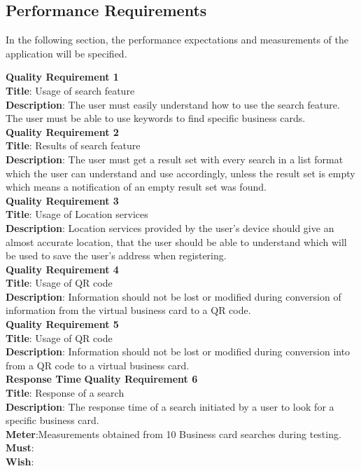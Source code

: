 \documentclass[english]{article}
\begin{document}
				\subsection{Performance Requirements}
				In the following section, the performance expectations and measurements of the application will be specified.
				
				\textbf{Quality Requirement 1}\\
				\textbf{Title}: Usage of search feature\\
				\textbf{Description}: The user must easily understand how to use the search feature. The user must be able to use keywords to find specific business cards.\\
				
				\textbf{Quality Requirement 2}\\
				\textbf{Title}: Results of search feature\\
				\textbf{Description}: The user must get a result set with every search in a list format which the user can understand and use accordingly, unless the result set is empty which means a notification of an empty result set was found.\\
				
				\textbf{Quality Requirement 3}\\
				\textbf{Title}: Usage of Location services\\
				\textbf{Description}: Location services provided by the user's device should give an almost accurate location, that the user should be able to understand which will be used to save the user's address when registering.\\
				
				\textbf{Quality Requirement 4}\\
				\textbf{Title}: Usage of QR code\\
				\textbf{Description}: Information should not be lost or modified during conversion of information from the virtual business card to a QR code.\\
				
				\textbf{Quality Requirement 5}\\
				\textbf{Title}: Usage of QR code\\
				\textbf{Description}: Information should not be lost or modified during conversion into from a QR code to a virtual business card.\\
				
				\textbf{Response Time}
				\textbf{Quality Requirement 6}\\
				\textbf{Title}: Response of a search\\
				\textbf{Description}: The response time of a search initiated by a user to look for a specific business card.\\
				\textbf{Meter}:Measurements obtained from 10 Business card searches during testing.\\
				\textbf{Must}:\\
				\textbf{Wish}:\\
				
\end{document}
